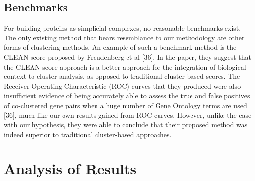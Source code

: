 \documentclass[9pt]{article}
\begin{document}
\subsection{Benchmarks}
For building proteins as simplicial complexes, no reasonable benchmarks exist. The only existing method  that bears resemblance to our methodology are other forms of clustering methods. An example of such a benchmark method is the CLEAN score proposed by Freudenberg et al [36]. In the paper, they suggest that the CLEAN score approach is a better approach for the integration of biological context to cluster analysis, as opposed to traditional cluster-based scores. The Receiver Operating Characteristic (ROC) curves that they produced were also insufficient evidence of being accurately able to assess the true and false positives of co-clustered gene pairs when a huge number of Gene Ontology terms are used [36], much like our own results gained from ROC curves. However, unlike the case with our hypothesis, they were able to conclude that their proposed method was indeed superior to traditional cluster-based approaches. 

\section{Analysis of Results}
\end{document}
